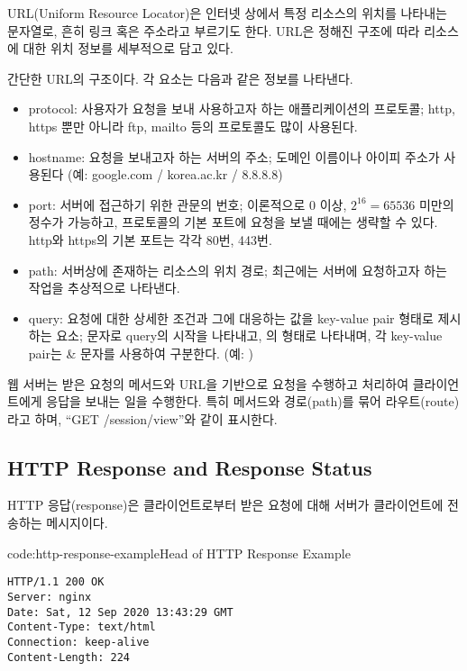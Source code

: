 URL(Uniform Resource Locator)은 인터넷 상에서 특정 리소스의 위치를 나타내는 문자열로, 흔히 링크 혹은 주소라고 부르기도 한다. URL은 정해진 구조에 따라 리소스에 대한 위치 정보를 세부적으로 담고 있다.

    {}

\는 간단한 URL의 구조이다. 각 요소는 다음과 같은 정보를 나타낸다.

\begin{itemize}
    \item protocol: 사용자가 요청을 보내 사용하고자 하는 애플리케이션의 프로토콜; http, https 뿐만 아니라 ftp, mailto 등의 프로토콜도 많이 사용된다.
    \item hostname: 요청을 보내고자 하는 서버의 주소; 도메인 이름이나 아이피 주소가 사용된다 (예: google.com / korea.ac.kr / 8.8.8.8)
    \item port: 서버에 접근하기 위한 관문의 번호; 이론적으로 0 이상, $2^{16}=65536$ 미만의 정수가 가능하고, 프로토콜의 기본 포트에 요청을 보낼 때에는 생략할 수 있다. http와 https의 기본 포트는 각각 80번, 443번.
    \item path: 서버상에 존재하는 리소스의 위치 경로; 최근에는 서버에 요청하고자 하는 작업을 추상적으로 나타낸다.
    \item query: 요청에 대한 상세한 조건과 그에 대응하는 값을 key-value pair 형태로 제시하는 요소;  문자로 query의 시작을 나타내고, 의 형태로 나타내며, 각 key-value pair는 \cd\& 문자를 사용하여 구분한다. (예: )
\end{itemize}

웹 서버는 받은 요청의 메서드와 URL을 기반으로 요청을 수행하고 처리하여 클라이언트에게 응답을 보내는 일을 수행한다. 특히 메서드와 경로(path)를 묶어 라우트(route)라고 하며, ``GET /session/view''와 같이 표시한다.

\subsection*{HTTP Response and Response Status}
HTTP 응답(response)은 클라이언트로부터 받은 요청에 대해 서버가 클라이언트에 전송하는 메시지이다.

\begin{codeenv}{code:http-response-example}{Head of HTTP Response Example}\begin{verbatim}
HTTP/1.1 200 OK
Server: nginx
Date: Sat, 12 Sep 2020 13:43:29 GMT
Content-Type: text/html
Connection: keep-alive
Content-Length: 224
\end{verbatim}
\end{codeenv}

